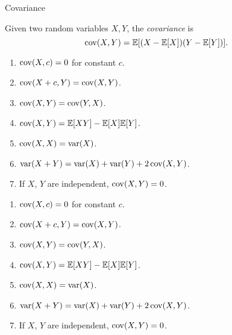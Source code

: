 %
\begin{note}
  \begin{field}
    Covariance
  \end{field}
  \begin{field}
    \begin{defi}[Covariance]
      Given two random variables $X, Y$, the \emph{covariance} is
      \[
        \operatorname{cov}(X, Y) = \mathbb{E}[(X - \mathbb{E}[X])(Y - \mathbb{E}[Y])].
      \]
    \end{defi}
  \end{field}
  \xplain{}%
\end{note}

\begin{note}
  \begin{field}
    \begin{prop}\leavevmode
      \begin{enumerate}
        \item $\operatorname{cov}(X, c) = 0$ for constant $c$.
        \item $\operatorname{cov}(X + c, Y) = \operatorname{cov} (X, Y)$.
        \item $\operatorname{cov} (X, Y) = \operatorname{cov} (Y, X)$.
        \item $\operatorname{cov} (X, Y) = \mathbb{E}[XY] - \mathbb{E}[X]\mathbb{E}[Y]$.
        \item $\operatorname{cov} (X, X) = \operatorname{var} (X)$.
        \item $\operatorname{var} (X + Y) = \operatorname{var} (X) + \operatorname{var} (Y) + 2\operatorname{cov} (X, Y)$.
        \item If $X$, $Y$ are independent, $\operatorname{cov}(X, Y) = 0$.
      \end{enumerate}
    \end{prop}
  \end{field}
  \begin{field}
    \begin{prop}\leavevmode
      \begin{enumerate}
        \item $\operatorname{cov}(X, c) = 0$ for constant $c$.
        \item $\operatorname{cov}(X + c, Y) = \operatorname{cov} (X, Y)$.
        \item $\operatorname{cov} (X, Y) = \operatorname{cov} (Y, X)$.
        \item $\operatorname{cov} (X, Y) = \mathbb{E}[XY] - \mathbb{E}[X]\mathbb{E}[Y]$.
        \item $\operatorname{cov} (X, X) = \operatorname{var} (X)$.
        \item $\operatorname{var} (X + Y) = \operatorname{var} (X) + \operatorname{var} (Y) + 2\operatorname{cov} (X, Y)$.
        \item If $X$, $Y$ are independent, $\operatorname{cov}(X, Y) = 0$.
      \end{enumerate}
    \end{prop}
  \end{field}
  \xplain{}%
\end{note}

